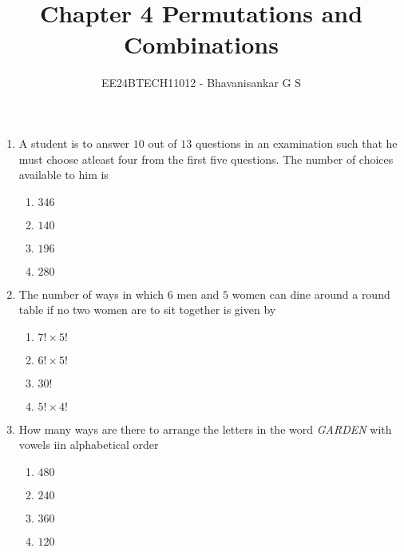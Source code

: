 \documentclass[journal,12pt,twocolumn]{IEEEtran}
\theoremstyle{remark}
\begin{document}

\vspace{3cm}

\title{Chapter 4 Permutations and Combinations}
\author{EE24BTECH11012 - Bhavanisankar G S}
\maketitle
\newpage
\bigskip

\renewcommand{\thefigure}{\theenumi}
\renewcommand{\thetable}{\theenumi}
\begin{enumerate}
	\item A student is to answer $10$ out of $13$ questions in an examination such that he must choose atleast four from the first five questions. The number of choices available to him is  \hfill {}	
       \begin{multicols}{4}		
\begin{enumerate} 
    \item  $346$
    \item  $140 $
    \item  $196$
    \item  $280$
      \end{enumerate}
      \end{multicols}
\item The number of ways in which $6$ men and $5$ women can dine around a round table if no two women are to sit together is given by \hfill {}
	\begin{multicols}{4}	
 \begin{enumerate}
 \item $7!\times5!$
 \item $6!\times 5!$
 \item $30!$
 \item $5!\times4!$
 \end{enumerate}
	\end{multicols}
\item How many ways are there to arrange the letters in the word \emph{GARDEN} with vowels iin alphabetical order \hfill {}
	\begin{multicols}{4}
		\begin{enumerate}
     \item $480$
     \item $240$
     \item $360$
     \item $120$
 \end{enumerate}
	\end{multicols}

\end{enumerate}
\end{document}
